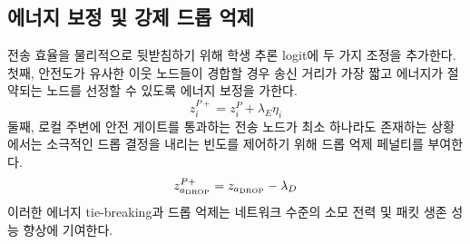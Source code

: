 \subsection{에너지 보정 및 강제 드롭 억제}
 전송 효율을 물리적으로 뒷받침하기 위해 학생 추론 logit에 두 가지 조정을 추가한다.
첫째, 안전도가 유사한 이웃 노드들이 경합할 경우 송신 거리가 가장 짧고 에너지가 절약되는 노드를 선정할 수 있도록 에너지 보정을 가한다.
\begin{equation}
    z_i^{P+} = z_i^P + \lambda_E \eta_i
\end{equation}
둘째, 로컬 주변에 안전 게이트를 통과하는 전송 노드가 최소 하나라도 존재하는 상황에서는 소극적인 드롭 결정을 내리는 빈도를 제어하기 위해 드롭 억제 페널티를 부여한다.
\begin{equation}
    z_{a_{\mathrm{DROP}}}^{P+} = z_{a_{\mathrm{DROP}}} - \lambda_D
\end{equation}
이러한 에너지 tie-breaking과 드롭 억제는 네트워크 수준의 소모 전력 및 패킷 생존 성능 향상에 기여한다.
